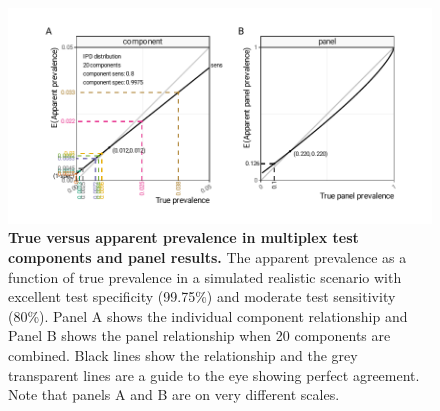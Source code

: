 \documentclass[10pt,letterpaper]{article}
\begin{document}
\begin{figure}[h!]
\centerline{\includegraphics{fig/true-apparent-prevalence-component-panels.pdf}}
\caption{{\bf True versus apparent prevalence in multiplex test components and panel results.}
The apparent prevalence as a function of true prevalence in a simulated realistic scenario with excellent test specificity (99.75\%) and moderate test sensitivity (80\%). Panel A shows the individual component relationship and Panel B shows the panel relationship when 20 components are combined. Black lines show the relationship and the grey transparent lines are a guide to the eye showing perfect agreement. Note that panels A and B are on very different scales.
}
\label{fig3}
\end{figure}
\end{document}
